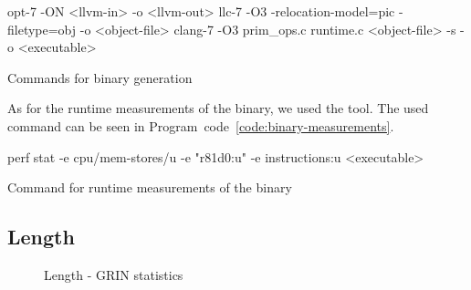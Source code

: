 \documentclass[main.tex]{subfiles}
\begin{document}
	\begin{codeFloat}[H]
		\begin{bash}
			opt-7 -ON <llvm-in> -o <llvm-out> 
			llc-7 -O3 -relocation-model=pic -filetype=obj -o <object-file>
			clang-7 -O3 prim_ops.c runtime.c <object-file> -s -o <executable>
		\end{bash}
		\caption{Commands for binary generation}
		\label{code:binary-gen}
	\end{codeFloat}
	
	As for the runtime measurements of the binary, we used the  tool. The used command can be seen in Program~code~\ref{code:binary-measurements}.

	\begin{codeFloat}[H]
		\begin{bash}
			perf stat -e cpu/mem-stores/u -e "r81d0:u" -e instructions:u <executable>
		\end{bash}
		\caption{Command for runtime measurements of the binary}
		\label{code:binary-measurements}
	\end{codeFloat}
	
	
	\subsection{Length}
	
	\begin{figure}[H]
		\hspace{-0.5cm}
		\renewcommand{\figurename}{Diagram}
		\caption{Length - GRIN statistics}
		\label{diagram:length-stats}
		\addtocounter{figure}{-1}
		\begin{minipage}{0.5\textwidth}
			\label{diagram:length-stats-rt}
		\end{minipage}
		\begin{minipage}{0.5\textwidth}
			\label{diagram:length-stats-ct}
		\end{minipage}
	\end{figure}
\end{document}
